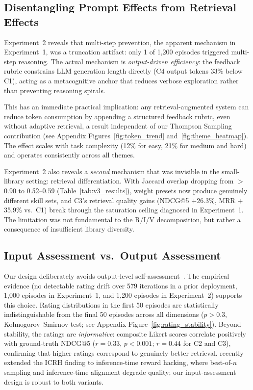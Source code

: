 
\subsection{Disentangling Prompt Effects from Retrieval Effects}

Experiment~2 reveals that multi-step prevention, the apparent mechanism in Experiment~1, was a truncation artifact: only 1 of 1{,}200 episodes triggered multi-step reasoning.
The actual mechanism is \emph{output-driven efficiency}: the feedback rubric constrains LLM generation length directly (C4 output tokens 33\% below C1), acting as a metacognitive anchor that reduces verbose exploration rather than preventing reasoning spirals.

This has an immediate practical implication: any retrieval-augmented system can reduce token consumption by appending a structured feedback rubric, even without adaptive retrieval, a result independent of our Thompson Sampling contribution (see Appendix Figures~\ref{fig:token_trend} and~\ref{fig:theme_heatmap}).
The effect scales with task complexity (12\% for easy, 21\% for medium and hard) and operates consistently across all themes.

Experiment~2 also reveals a \emph{second} mechanism that was invisible in the small-library setting: retrieval differentiation.
With Jaccard overlap dropping from ${>}$0.90 to 0.52--0.59 (Table~\ref{tab:v3_results}), weight presets now produce genuinely different skill sets, and C3's retrieval quality gains (NDCG@5 $+$26.3\%, MRR $+$35.9\% vs.\ C1) break through the saturation ceiling diagnosed in Experiment~1.
The limitation was not fundamental to the R/I/V decomposition, but rather a consequence of insufficient library diversity.

\subsection{Input Assessment vs.\ Output Assessment}

Our design deliberately avoids output-level self-assessment~\citep{pan2024feedback}.
The empirical evidence (no detectable rating drift over 579 iterations in a prior deployment, 1{,}000 episodes in Experiment~1, and 1{,}200 episodes in Experiment~2) supports this choice.
Rating distributions in the first 50 episodes are statistically indistinguishable from the final 50 episodes across all dimensions ($p > 0.3$, Kolmogorov--Smirnov test; see Appendix Figure~\ref{fig:rating_stability}).
Beyond stability, the ratings are \emph{informative}: composite Likert scores correlate positively with ground-truth NDCG@5 ($r{=}0.33$, $p{<}0.001$; $r{=}0.44$ for C2 and C3), confirming that higher ratings correspond to genuinely better retrieval.
\citet{khalaf2025itrh} recently extended the ICRH finding to inference-time reward hacking, where best-of-$n$ sampling and inference-time alignment degrade quality; our input-assessment design is robust to both variants.

